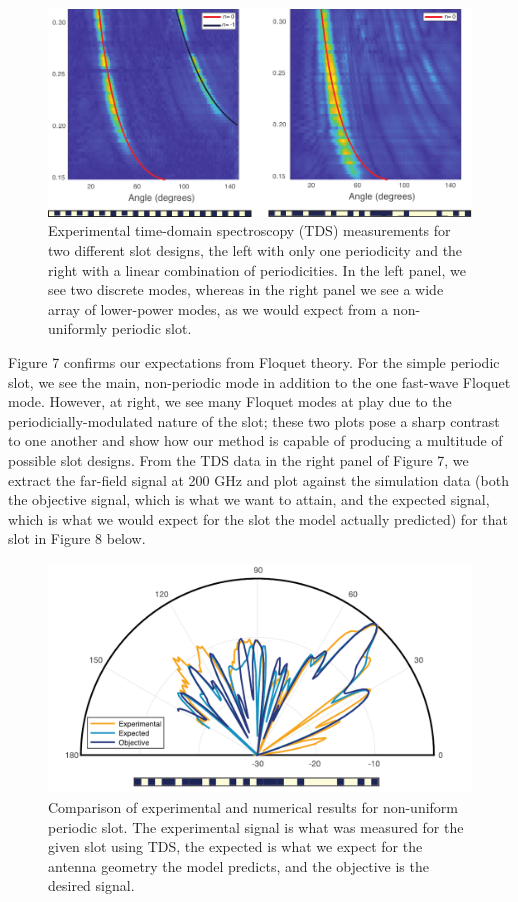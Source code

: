 \documentclass[11pt]{article}
\begin{document}
\begin{figure}[H]
	\centering
	\includegraphics{figures/exp-fig1pdf}
	\caption{Experimental time-domain spectroscopy (TDS) measurements for two different slot designs, the left with only one periodicity and the right with a linear combination of periodicities. In the left panel, we see two discrete modes, whereas in the right panel we see a wide array of lower-power modes, as we would expect from a non-uniformly periodic slot.}
\end{figure}

\noindent Figure 7 confirms our expectations from Floquet theory. For the simple periodic slot, we see the main, non-periodic mode in addition to the one fast-wave Floquet mode. However, at right, we see many Floquet modes at play due to the periodicially-modulated nature of the slot; these two plots pose a sharp contrast to one another and show how our method is capable of producing a multitude of possible slot designs. From the TDS data in the right panel of Figure 7, we extract the far-field signal at 200 GHz and plot against the simulation data (both the objective signal, which is what we want to attain, and the expected signal, which is what we would expect for the slot the model actually predicted) for that slot in Figure 8 below.

\begin{figure}[H]
	\centering
	\includegraphics[height=2.4in]{figures/477exppdf2}
	\caption{Comparison of experimental and numerical results for non-uniform periodic slot. The experimental signal is what was measured for the given slot using TDS, the expected is what we expect for the antenna geometry the model predicts, and the objective is the desired signal.}
\end{figure}
\end{document}
